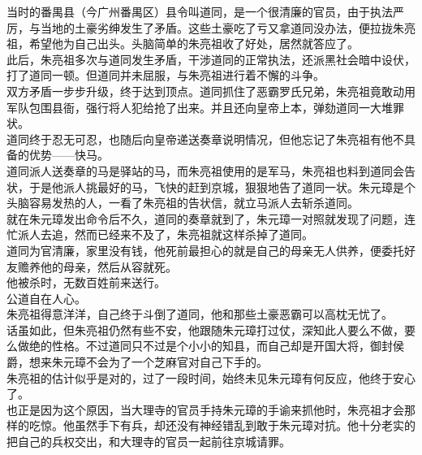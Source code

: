 \begin{multicols}{\theparacolNo}
当时的番禺县（今广州番禺区）县令叫道同，是一个很清廉的官员，由于执法严厉，与当地的土豪劣绅发生了矛盾。这些土豪吃了亏又拿道同没办法，便拉拢朱亮祖，希望他为自己出头。头脑简单的朱亮祖收了好处，居然就答应了。\\

此后，朱亮祖多次与道同发生矛盾，干涉道同的正常执法，还派黑社会暗中设伏，打了道同一顿。但道同并未屈服，与朱亮祖进行着不懈的斗争。\\

双方矛盾一步步升级，终于达到顶点。道同抓住了恶霸罗氏兄弟，朱亮祖竟敢动用军队包围县衙，强行将人犯给抢了出来。并且还向皇帝上本，弹劾道同一大堆罪状。\\

道同终于忍无可忍，也随后向皇帝递送奏章说明情况，但他忘记了朱亮祖有他不具备的优势——快马。\\

道同派人送奏章的马是驿站的马，而朱亮祖使用的是军马，朱亮祖也料到道同会告状，于是他派人挑最好的马，飞快的赶到京城，狠狠地告了道同一状。朱元璋是个头脑容易发热的人，一看了朱亮祖的告状信，就立马派人去斩杀道同。\\

就在朱元璋发出命令后不久，道同的奏章就到了，朱元璋一对照就发现了问题，连忙派人去追，然而已经来不及了，朱亮祖就这样杀掉了道同。\\

道同为官清廉，家里没有钱，他死前最担心的就是自己的母亲无人供养，便委托好友赡养他的母亲，然后从容就死。\\

他被杀时，无数百姓前来送行。\\

公道自在人心。\\

朱亮祖得意洋洋，自己终于斗倒了道同，他和那些土豪恶霸可以高枕无忧了。\\

话虽如此，但朱亮祖仍然有些不安，他跟随朱元璋打过仗，深知此人要么不做，要么做绝的性格。不过道同只不过是个小小的知县，而自己却是开国大将，御封侯爵，想来朱元璋不会为了一个芝麻官对自己下手的。\\

朱亮祖的估计似乎是对的，过了一段时间，始终未见朱元璋有何反应，他终于安心了。\\

也正是因为这个原因，当大理寺的官员手持朱元璋的手谕来抓他时，朱亮祖才会那样的吃惊。他虽然手下有兵，却还没有神经错乱到敢于朱元璋对抗。他十分老实的把自己的兵权交出，和大理寺的官员一起前往京城请罪。\\


\end{multicols}
